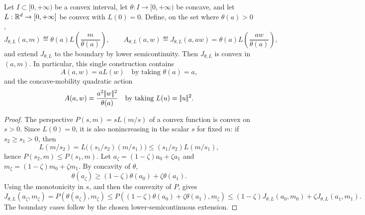 \begin{prop}\label{prop-momentum-perspective-convexity}
	Let \(I\subset[0,+\infty)\) be a convex interval, let \(\theta:I\to[0,+\infty)\) be concave, and let \(L:\mathbb{R}^d\to[0,+\infty]\) be convex with \(L(0)=0\). Define, on the set where \(\theta(a)>0\),
	\begin{equation}\label{eq-concave-mobility-perspective}
		J_{\theta,L}(a,m)
		\eqdef
		\theta(a)L\!\left(\frac{m}{\theta(a)}\right),
		\qquad
		A_{\theta,L}(a,w)
		\eqdef
		J_{\theta,L}(a,aw)
		=
		\theta(a)L\!\left(\frac{aw}{\theta(a)}\right),
	\end{equation}
	and extend \(J_{\theta,L}\) to the boundary by lower semicontinuity. Then \(J_{\theta,L}\) is convex in \((a,m)\). In particular, this single construction contains
	\[
		A(a,w)=aL(w)
		\quad\text{by taking }\theta(a)=a,
	\]
	and the concave-mobility quadratic action
	\[
		A(a,w)=\frac{a^2|\!| w |\!|^2}{\theta(a)}
		\quad\text{by taking }L(u)=|\!| u |\!|^2.
	\]
\end{prop}

\begin{proof}
	The perspective \(P(s,m)=sL(m/s)\) of a convex function is convex on \(s>0\). Since \(L(0)=0\), it is also nonincreasing in the scalar \(s\) for fixed \(m\): if \(s_2\geq s_1>0\), then
	\[
		L(m/s_2)
		=
		L\big((s_1/s_2)(m/s_1)\big)
		\leq
		(s_1/s_2)L(m/s_1),
	\]
	hence \(P(s_2,m)\leq P(s_1,m)\). Let \(a_\zeta=(1-\zeta)a_0+\zeta a_1\) and \(m_\zeta=(1-\zeta)m_0+\zeta m_1\). By concavity of \(\theta\),
	\[
		\theta(a_\zeta)
		\geq
		(1-\zeta)\theta(a_0)+\zeta\theta(a_1).
	\]
	Using the monotonicity in \(s\), and then the convexity of \(P\), gives
	\[
		J_{\theta,L}(a_\zeta,m_\zeta)
		=
		P(\theta(a_\zeta),m_\zeta)
		\leq
		P((1-\zeta)\theta(a_0)+\zeta\theta(a_1),m_\zeta)
		\leq
		(1-\zeta)J_{\theta,L}(a_0,m_0)+\zeta J_{\theta,L}(a_1,m_1).
	\]
	The boundary cases follow by the chosen lower-semicontinuous extension.
	\end{proof}

